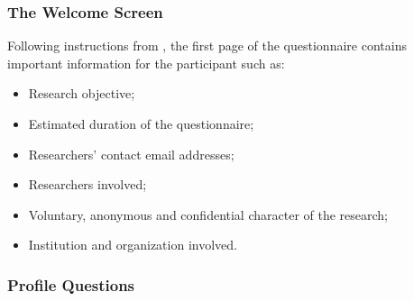 \subsubsection{The Welcome Screen}

Following instructions from \textcite{kasunic2005designing}, the first page of the questionnaire contains important information for the participant such as:


\begin{itemize}
  \item Research objective;
  \item Estimated duration of the questionnaire;
  \item Researchers' contact email addresses;
  \item Researchers involved;
  \item Voluntary, anonymous and confidential character of the research;
  \item Institution and organization involved.
\end{itemize}

\subsubsection{Profile Questions}\label{survey:profile-questions}

